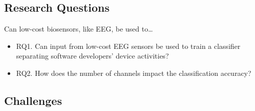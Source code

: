 \documentclass{IEEEtran}
\begin{document}
\begin{refsection}
%
%
%




\subsection{Research Questions}


Can low-cost biosensors, like EEG, be used to\ldots

\begin{itemize}
    \item RQ1. Can input from low-cost EEG sensors be used to train a classifier separating software developers' device activities?
    \item RQ2. How does the number of channels impact the classification accuracy?
\end{itemize}

\subsection{Challenges}


\end{refsection}
\end{document}
